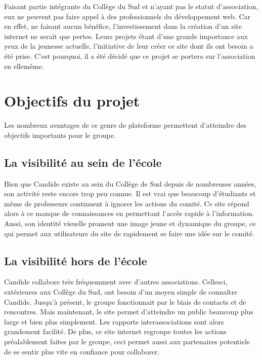 \documentclass[a4,10pt,french]{sphinxmanual}
\begin{document}
Faisant partie intégrante du Collège du Sud et n’ayant pas le statut d’association, eux ne peuvent pas faire appel à des professionnels du développement web. Car en effet, ne faisant aucun bénéfice, l’investissement dans la création d’un site internet ne serait que pertes. Leurs projets étant d’une grande importance aux yeux de la jeunesse actuelle, l’initiative de leur créer ce site dont ils ont besoin a été prise. C’est pourquoi, il a été décidé que ce projet se portera sur l’association en elle\sphinxhyphen{}même.


\section{Objectifs du projet}
\label{\detokenize{introduction:objectifs-du-projet}}
\sphinxAtStartPar
Les nombreux avantages de ce genre de plateforme permettent d’atteindre des objectifs importants pour le groupe.


\subsection{La visibilité au sein de l’école}
\label{\detokenize{introduction:la-visibilite-au-sein-de-lecole}}
\sphinxAtStartPar
Bien que Candide existe au sein du Collège de Sud depuis de nombreuses années, son activité reste encore trop peu connue. Il est vrai que beaucoup d’étudiants et même de professeurs continuent à ignorer les actions du comité. Ce site répond alors à ce manque de connaissances en permettant l’accès rapide à l’information. Aussi, son identité visuelle promeut une image jeune et dynamique du groupe, ce qui permet aux utilisateurs du site de rapidement se faire une idée sur le comité.


\subsection{La visibilité hors de l’école}
\label{\detokenize{introduction:la-visibilite-hors-de-lecole}}
\sphinxAtStartPar
Candide collabore très fréquemment avec d’autres associations. Celles\sphinxhyphen{}ci, extérieures aux Collège du Sud, ont besoin d’un moyen simple de connaître Candide. Jusqu’à présent, le groupe fonctionnait par le biais de contacts et de rencontres. Mais maintenant, le site permet d’atteindre un public beaucoup plus large et bien plus simplement. Les rapports inter\sphinxhyphen{}associations sont alors grandement facilité. De plus, ce site internet regroupe toutes les actions préalablement faites par le groupe, ceci permet aussi aux partenaires potentiels de se sentir plus vite en confiance pour collaborer.
\end{document}
